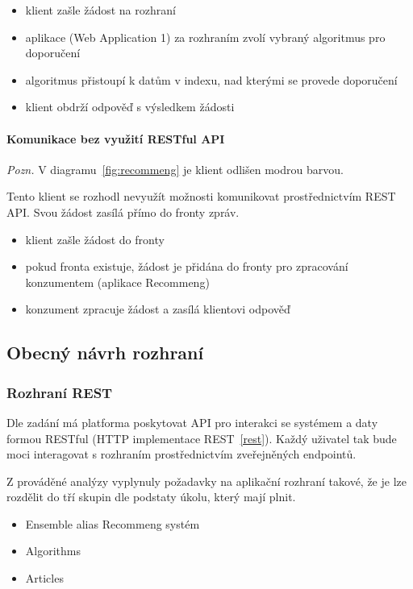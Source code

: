 \documentclass[thesis=M,czech]{FITthesis}[2014/05/07]
\begin{document}
\begin{itemize}
	\item klient zašle žádost na rozhraní
	\item aplikace (Web Application 1) za rozhraním zvolí vybraný algoritmus pro doporučení
	\item algoritmus přistoupí k datům v indexu, nad kterými se provede doporučení
	\item klient obdrží odpověď s výsledkem žádosti
\end{itemize}

\paragraph{Komunikace bez využití RESTful API}

\emph{Pozn.} V diagramu~\ref{fig:recommeng} je klient odlišen modrou barvou.

Tento klient se rozhodl nevyužít možnosti komunikovat prostřednictvím REST API. Svou žádost zasílá přímo do fronty zpráv.

\begin{itemize}
	\item klient zašle žádost do fronty
	\item pokud fronta existuje, žádost je přidána do fronty pro zpracování konzumentem (aplikace Recommeng)
	\item konzument zpracuje žádost a zasílá klientovi odpověď
\end{itemize}

\subsection{Obecný návrh rozhraní}
\label{sec:recommeng}

\subsubsection{Rozhraní REST}
Dle zadání má platforma poskytovat API pro interakci se systémem a daty formou RESTful (HTTP implementace REST~\ref{rest}). Každý uživatel tak bude moci interagovat s rozhraním prostřednictvím zveřejněných endpointů.

Z prováděné analýzy vyplynuly požadavky na aplikační rozhraní takové, že je lze rozdělit do tří skupin dle podstaty úkolu, který mají plnit. 

\begin{itemize}
	\item Ensemble alias Recommeng systém
	\item Algorithms
	\item Articles
\end{itemize}
\end{document}
